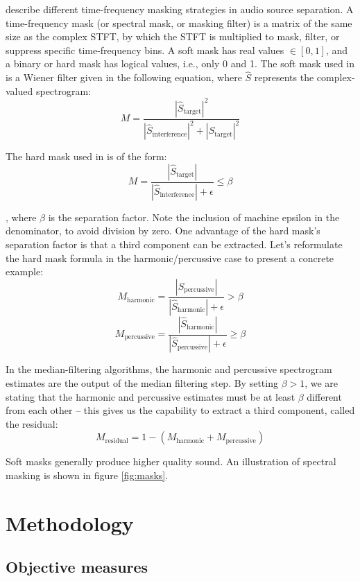 \documentclass[letter,12pt]{article}
\begin{document}
\citet{masking} describe different time-frequency masking strategies in audio source separation. A time-frequency mask (or spectral mask, or masking filter) is a matrix of the same size as the complex STFT, by which the STFT is multiplied to mask, filter, or suppress specific time-frequency bins. A soft mask has real values $\in [0, 1]$, and a binary or hard mask has logical values, i.e., only 0 and 1. The soft mask used in \cite{fitzgerald1, fitzgerald2} is a Wiener filter given in the following equation, where $\hat{S}$ represents the complex-valued spectrogram:
\[ M = \frac{|\hat{S}_{\text{target}}|^{2}}{|\hat{S}_{\text{interference}}|^{2} + |\hat{S}_{\text{target}}|^{2}} \]

The hard mask used in \cite{driedger} is of the form:
\[ M = \frac{|\hat{S}_{\text{target}}|}{|\hat{S}_{\text{interference}}| + \epsilon} \le \beta \]

, where $\beta$ is the separation factor. Note the inclusion of machine epsilon in the denominator, to avoid division by zero. One advantage of the hard mask's separation factor is that a third component can be extracted. Let's reformulate the hard mask formula in the harmonic/percussive case to present a concrete example:
\[ M_{\text{harmonic}} = \frac{|\hat{S}_{\text{percussive}}|}{|\hat{S}_{\text{harmonic}}| + \epsilon} > \beta \]
\[ M_{\text{percussive}} = \frac{|\hat{S}_{\text{harmonic}}|}{|\hat{S}_{\text{percussive}}| + \epsilon} \ge \beta \]

In the median-filtering algorithms, the harmonic and percussive spectrogram estimates are the output of the median filtering step. By setting $\beta > 1$, we are stating that the harmonic and percussive estimates must be at least $\beta$ different from each other -- this gives us the capability to extract a third component, called the residual:
\[ M_{\text{residual}} = 1 - (M_{\text{harmonic}} + M_{\text{percussive}}) \]

Soft masks generally produce higher quality sound. An illustration of spectral masking is shown in figure \ref{fig:masks}.

\section{Methodology}
\label{sec:methodology}

\subsection{Objective measures}
\end{document}
